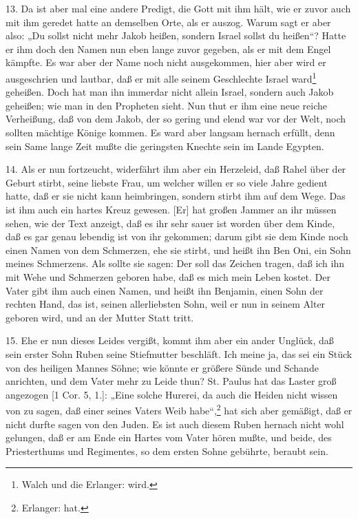 13. Da ist aber mal eine andere Predigt, die Gott mit ihm hält, wie er zuvor auch mit ihm geredet hatte an demselben Orte, als er auszog. Warum sagt er aber also: „Du sollst nicht mehr Jakob heißen, sondern Israel sollst du heißen“? Hatte er ihm doch den Namen nun eben lange zuvor gegeben, als er mit dem Engel kämpfte. Es war aber der Name noch nicht ausgekommen, hier aber wird er ausgeschrien und lautbar, daß er mit alle seinem Geschlechte Israel ward\footnote{Walch und die Erlanger: wird.} geheißen. Doch hat man ihn immerdar nicht allein Israel, sondern auch Jakob geheißen; wie man in den Propheten sieht. Nun thut er ihm eine neue reiche Verheißung, daß von dem Jakob, der so gering und elend war vor der Welt, noch sollten mächtige Könige kommen. Es ward aber langsam hernach erfüllt, denn sein Same lange Zeit mußte die geringsten Knechte sein im Lande Egypten.

14. Als er nun fortzeucht, widerfährt ihm aber ein Herzeleid, daß Rahel über der Geburt stirbt, seine liebste Frau, um welcher willen er so viele Jahre gedient hatte, daß er sie nicht kann heimbringen, sondern stirbt ihm auf dem Wege. Das ist ihm auch ein hartes Kreuz gewesen. [Er] hat großen Jammer an ihr müssen sehen, wie der Text anzeigt, daß es ihr sehr sauer ist worden über dem Kinde, daß es gar genau lebendig ist von ihr gekommen; darum gibt sie dem Kinde noch einen Namen von dem Schmerzen, ehe sie stirbt, und heißt ihn Ben Oni, ein Sohn meines Schmerzens. Als sollte sie sagen: Der soll das Zeichen tragen, daß ich ihn mit Wehe und Schmerzen geboren habe, daß es mich mein Leben kostet. Der Vater gibt ihm auch einen Namen, und heißt ihn Benjamin, einen Sohn der rechten Hand, das ist, seinen allerliebsten Sohn, weil er nun in seinem Alter geboren wird, und an der Mutter Statt tritt.

15. Ehe er nun dieses Leides vergißt, kommt ihm aber ein ander Unglück, daß sein erster Sohn Ruben seine Stiefmutter beschläft. Ich meine ja, das sei ein Stück von des heiligen Mannes Söhne; wie könnte er größere Sünde und Schande anrichten, und dem Vater mehr zu Leide thun? St. Paulus hat das Laster groß angezogen [1 Cor. 5, 1.]: „Eine solche Hurerei, da auch die Heiden nicht wissen von zu sagen, daß einer seines Vaters Weib habe“,\footnote{Erlanger: hat.} hat sich aber gemäßigt, daß er nicht durfte sagen von den Juden. Es ist auch diesem Ruben hernach nicht wohl gelungen, daß er am Ende ein Hartes vom Vater hören mußte, und beide, des Priesterthums und Regimentes, so dem ersten Sohne gebührte, beraubt sein.

